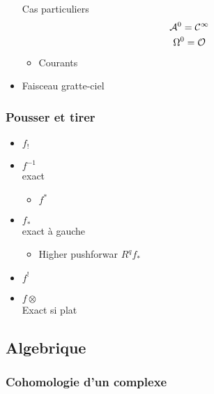 \documentclass[12pt,makeidx]{amsart}
\begin{document}
\begin{itemize}
Cas particuliers
\[
\mathcal{A}^0 = \mathcal{C}^\infty
\]
\[
\Omega^0 = \mathcal{O}
\]
\begin{itemize}

\item Courants\\
\label{sec-1-1-1-2-1}%
\cite{Demailly}
\end{itemize} %

\item Faisceau gratte-ciel
\label{sec-1-1-1-3}%
\end{itemize} %
\subsubsection{Pousser et tirer}
\label{sec-1-1-2}

\cite{Virk}
\begin{itemize}

\item $f_!$
\label{sec-1-1-2-1}%

\item $f^{-1}$\\
\label{sec-1-1-2-2}%
exact
\begin{itemize}

\item $f^*$
\label{sec-1-1-2-2-1}%
\end{itemize} %

\item $f_*$\\
\label{sec-1-1-2-3}%
exact à gauche
\begin{itemize}

\item Higher pushforwar $R^qf_*$
\label{sec-1-1-2-3-1}%
\end{itemize} %

\item $f^!$
\label{sec-1-1-2-4}%

\item $f \otimes$\\
\label{sec-1-1-2-5}%
Exact si plat
\end{itemize} %
\subsection{Algebrique}
\label{sec-1-2}
\subsubsection{Cohomologie d'un complexe}
\label{sec-1-2-1}
\end{document}
